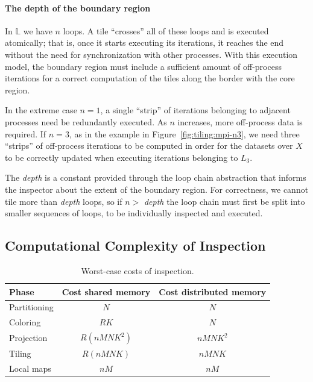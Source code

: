 \paragraph{The depth of the boundary region}
In $\mathbb{L}$ we have $n$ loops. A tile ``crosses'' all of these loops and is executed atomically; that is, once it starts executing its iterations, it reaches the end without the need for synchronization with other processes. With this execution model, the boundary region must include a sufficient amount of off-process iterations for a correct computation of the tiles along the border with the core region. 

In the extreme case $n=1$, a single ``strip'' of iterations belonging to adjacent processes need be redundantly executed. As $n$ increases, more off-process data is required. If $n=3$, as in the example in Figure~\ref{fig:tiling:mpi-n3}, we need three ``strips'' of off-process iterations to be computed in order for the datasets over $X$ to be correctly updated when executing iterations belonging to $L_3$.

The {\em depth} is a constant provided through the loop chain abstraction that informs the inspector about the extent of the boundary region. For correctness, we cannot tile more than {\em depth} loops, so if $n >$ {\em depth} the loop chain must first be split into smaller sequences of loops, to be individually inspected and executed. 





\subsection{Computational Complexity of Inspection}

\begin{table}[t]
\centering
\begin{tabulary}{1.0\columnwidth}{P{2.7cm} | c | c}
\hline
Phase & Cost shared memory & Cost distributed memory \\
\hline
Partitioning & $N$ & $N$ \\
Coloring & $R K $ & $N$ \\ 
Projection & $R (n M N K^2) $ & $n M N K^2 $ \\ 
Tiling & $R (n M N K) $ & $n M N K $ \\
Local maps & $n M$ & $n M$\\
\hline
\end{tabulary}
\caption{Worst-case costs of inspection.}
\label{table:st-comp-cost}
\end{table}

